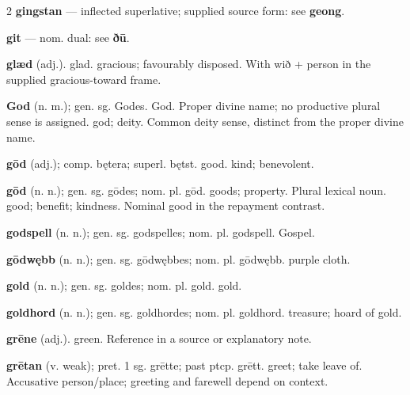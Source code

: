 \begin{multicols*}{2}
\textbf{gingstan} — inflected superlative; supplied source form: see \textbf{geong}.\par
\textbf{git} — nom. dual: see \textbf{ðū}.\par
\textbf{glæd} (adj.). glad. gracious; favourably disposed. With wið + person in the supplied gracious-toward frame.\par
\textbf{God} (n. m.); gen. sg. Godes. God. Proper divine name; no productive plural sense is assigned. god; deity. Common deity sense, distinct from the proper divine name.\par
\textbf{gōd} (adj.); comp. bętera; superl. bętst. good. kind; benevolent.\par
\textbf{gōd} (n. n.); gen. sg. gōdes; nom. pl. gōd. goods; property. Plural lexical noun. good; benefit; kindness. Nominal good in the repayment contrast.\par
\textbf{godspell} (n. n.); gen. sg. godspelles; nom. pl. godspell. Gospel.\par
\textbf{gōdwębb} (n. n.); gen. sg. gōdwębbes; nom. pl. gōdwębb. purple cloth.\par
\textbf{gold} (n. n.); gen. sg. goldes; nom. pl. gold. gold.\par
\textbf{goldhord} (n. n.); gen. sg. goldhordes; nom. pl. goldhord. treasure; hoard of gold.\par
\textbf{grēne} (adj.). green. Reference in a source or explanatory note.\par
\textbf{grētan} (v. weak); pret. 1 sg. grētte; past ptcp. grētt. greet; take leave of. Accusative person/place; greeting and farewell depend on context.\par

\end{multicols*}
